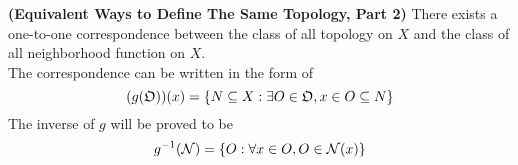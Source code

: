 \documentclass{report}
\begin{document}
\begin{theorem}
\label{2.5.5}
\textbf{(Equivalent Ways to Define The Same Topology, Part 2)} There exists a one-to-one correspondence between the class of all topology on $X$ and the class of all neighborhood function on $X$.\\

The correspondence can be written in the form of 
\begin{equation} (g(\mathfrak{O}))(x)=\{ N\subseteq X: \exists O\in \mathfrak{O},x\in O\subseteq N \}
\end{equation}
The inverse of $g$ will be proved to be
 \begin{equation}
g^{-1}(\mathcal{N})=\{ O:\forall x \in O, O\in \mathcal{N}(x) \}
\end{equation}
\end{theorem}
\end{document}

